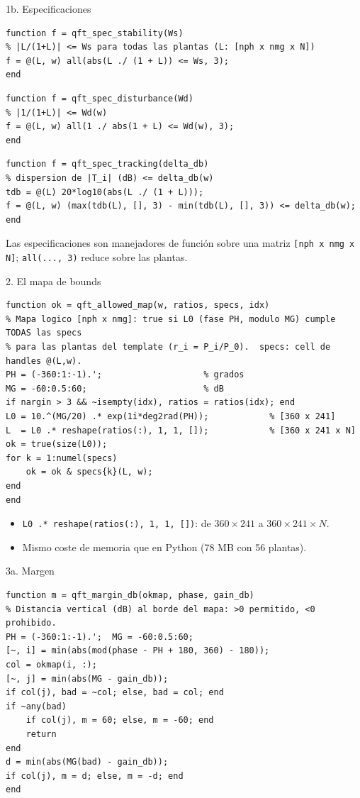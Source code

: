 \documentclass[aspectratio=169,11pt]{beamer}
\begin{document}
\begin{frame}[fragile]{1b. Especificaciones}
\scriptsize
\begin{verbatim}
function f = qft_spec_stability(Ws)
% |L/(1+L)| <= Ws para todas las plantas (L: [nph x nmg x N])
f = @(L, w) all(abs(L ./ (1 + L)) <= Ws, 3);
end
\end{verbatim}
\scriptsize
\begin{verbatim}
function f = qft_spec_disturbance(Wd)
% |1/(1+L)| <= Wd(w)
f = @(L, w) all(1 ./ abs(1 + L) <= Wd(w), 3);
end
\end{verbatim}
\scriptsize
\begin{verbatim}
function f = qft_spec_tracking(delta_db)
% dispersion de |T_i| (dB) <= delta_db(w)
tdb = @(L) 20*log10(abs(L ./ (1 + L)));
f = @(L, w) (max(tdb(L), [], 3) - min(tdb(L), [], 3)) <= delta_db(w);
end
\end{verbatim}
\footnotesize Las especificaciones son manejadores de función sobre una matriz \texttt{[nph x nmg x N]}; \texttt{all(..., 3)} reduce sobre las plantas.
\end{frame}

\begin{frame}[fragile]{2. El mapa de bounds}
\scriptsize
\begin{verbatim}
function ok = qft_allowed_map(w, ratios, specs, idx)
% Mapa logico [nph x nmg]: true si L0 (fase PH, modulo MG) cumple TODAS las specs
% para las plantas del template (r_i = P_i/P_0).  specs: cell de handles @(L,w).
PH = (-360:1:-1).';                    % grados
MG = -60:0.5:60;                       % dB
if nargin > 3 && ~isempty(idx), ratios = ratios(idx); end
L0 = 10.^(MG/20) .* exp(1i*deg2rad(PH));            % [360 x 241]
L  = L0 .* reshape(ratios(:), 1, 1, []);            % [360 x 241 x N]
ok = true(size(L0));
for k = 1:numel(specs)
    ok = ok & specs{k}(L, w);
end
end
\end{verbatim}

\footnotesize
\begin{itemize}
\item \texttt{L0 .* reshape(ratios(:), 1, 1, [])}: de $360\times241$ a $360\times241\times N$.
\item Mismo coste de memoria que en Python (78 MB con 56 plantas).
\end{itemize}
\end{frame}

\begin{frame}[fragile]{3a. Margen}
\footnotesize
\begin{verbatim}
function m = qft_margin_db(okmap, phase, gain_db)
% Distancia vertical (dB) al borde del mapa: >0 permitido, <0 prohibido.
PH = (-360:1:-1).';  MG = -60:0.5:60;
[~, i] = min(abs(mod(phase - PH + 180, 360) - 180));
col = okmap(i, :);
[~, j] = min(abs(MG - gain_db));
if col(j), bad = ~col; else, bad = col; end
if ~any(bad)
    if col(j), m = 60; else, m = -60; end
    return
end
d = min(abs(MG(bad) - gain_db));
if col(j), m = d; else, m = -d; end
end
\end{verbatim}
\end{frame}
\end{document}

